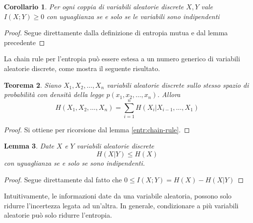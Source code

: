 \documentclass[a4paper,11pt]{book}
\theoremstyle{plain}
\newtheorem{teo}{Teorema}[chapter]
\newtheorem{lemma}[teo]{Lemma}
\newtheorem{cor}[teo]{Corollario}
\theoremstyle{definition}
\theoremstyle{remark}
\begin{document}
\begin{cor}
	Per ogni coppia di variabili aleatorie discrete $X,Y$ vale $I(X;Y)\geq 0$ con uguaglianza se e solo se le variabili sono indipendenti
\end{cor}
\begin{proof}
	Segue direttamente dalla definizione di entropia mutua e dal lemma precedente
\end{proof}
La chain rule per l'entropia può essere estesa a un numero generico di variabili aleatorie discrete, come mostra il seguente risultato.
\begin{teo}
	Siano $X_1, X_2, \ldots , X_n$ variabili aleatorie discrete sullo stesso spazio di probabilità con densità della legge $p(x_1,x_2,\ldots,x_n)$. Allora
	\begin{equation*}
		H(X_1,X_2,\ldots,X_n) = \sum_{i = 1}^{n}{H(X_i|X_{i-1},\ldots,X_1)}
	\end{equation*}
\end{teo}
\begin{proof}
	Si ottiene per ricorsione dal lemma \ref{entr:chain-rule}.
\end{proof}
\begin{lemma}
	Date $X$ e $Y$ variabili aleatorie discrete
	\begin{equation*}
		H(X|Y) \leq H(X)
	\end{equation*}
	con uguaglianza se e solo se sono indipendenti.
\end{lemma}
\begin{proof}
	Segue direttamente dal fatto che $0\leq I(X;Y) = H(X)-H(X|Y)$
\end{proof}
Intuitivamente, le informazioni date da una variabile aleatoria, possono solo ridurre l'incertezza legata ad un'altra. In generale, condizionare a più variabili aleatorie può solo ridurre l'entropia.
\end{document}
